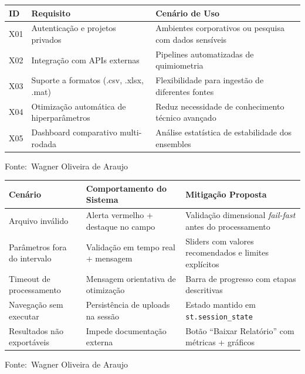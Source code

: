 \documentclass[12pt,a4paper]{article}
\newcommand{\oautor}{Wagner Oliveira de Araujo}
\begin{document}
\begin{quadro}[ht]
\centering
\small
\caption{Requisitos extras para fases futuras (Could Have)}
\label{quadro:extras}
\begin{threeparttable}
\begin{tabularx}{\textwidth}{|l|X|X|} \hline
\textbf{ID} & \textbf{Requisito} & \textbf{Cenário de Uso} \\ \hline
X01 & Autenticação e projetos privados & Ambientes corporativos ou pesquisa com dados sensíveis \\ \hline
X02 & Integração com APIs externas & Pipelines automatizadas de quimiometria \\ \hline
X03 & Suporte a formatos (.csv, .xlsx, .mat) & Flexibilidade para ingestão de diferentes fontes \\ \hline
X04 & Otimização automática de hiperparâmetros & Reduz necessidade de conhecimento técnico avançado \\ \hline
X05 & Dashboard comparativo multi-rodada & Análise estatística de estabilidade dos ensembles \\ \hline
\end{tabularx}
\begin{tablenotes}[flushleft]
\footnotesize
\item Fonte:~\oautor
\end{tablenotes}
\end{threeparttable}
\end{quadro}

\begin{quadro}[ht]
\centering
\small
\caption{Tratamento de exceções e usabilidade}
\label{quadro:excecoes}
\begin{threeparttable}
\begin{tabularx}{\textwidth}{|l|X|X|} \hline
\textbf{Cenário} & \textbf{Comportamento do Sistema} & \textbf{Mitigação Proposta} \\ \hline
Arquivo inválido & Alerta vermelho + destaque no campo & Validação dimensional \textit{fail-fast} antes do processamento \\ \hline
Parâmetros fora do intervalo & Validação em tempo real + mensagem & Sliders com valores recomendados e limites explícitos \\ \hline
Timeout de processamento & Mensagem orientativa de otimização & Barra de progresso com etapas descritivas \\ \hline
Navegação sem executar & Persistência de uploads na sessão & Estado mantido em \texttt{st.session\_state} \\ \hline
Resultados não exportáveis & Impede documentação externa & Botão ``Baixar Relatório'' com métricas + gráficos \\ \hline
\end{tabularx}
\begin{tablenotes}[flushleft]
\footnotesize
\item Fonte:~\oautor
\end{tablenotes}
\end{threeparttable}
\end{quadro}
\end{document}
